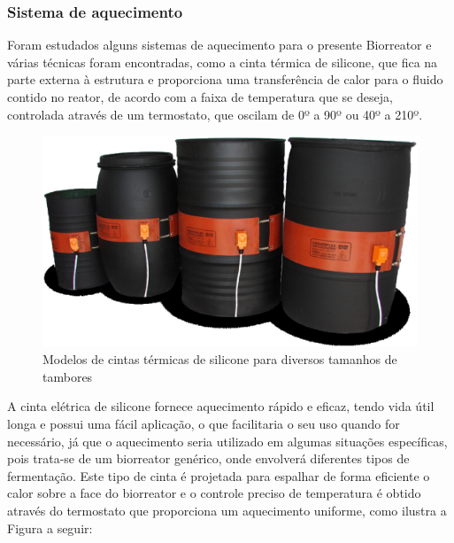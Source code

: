 \subsubsection{Sistema de aquecimento}

Foram estudados alguns sistemas de aquecimento para o presente Biorreator e várias técnicas foram encontradas, como a  cinta térmica de silicone, que fica na parte externa à estrutura e proporciona uma transferência de calor para o fluido contido no reator, de acordo com a faixa de temperatura que se deseja, controlada através de um termostato, que oscilam de 0º a 90º ou 40º a 210º.

\begin{figure}[h]
	\centering
	\includegraphics[keepaspectratio=true,scale=0.3]{figuras/cinta.eps}
	\caption{Modelos de cintas térmicas de silicone para diversos tamanhos de tambores}
	\label{cinta}
\end{figure}

A cinta elétrica de silicone fornece aquecimento rápido e eficaz, tendo vida útil longa e possui uma fácil aplicação, o que facilitaria o seu uso quando for necessário, já que o aquecimento seria utilizado em algumas situações específicas, pois trata-se de um biorreator genérico, onde envolverá diferentes tipos de fermentação. Este tipo de cinta é projetada para espalhar de forma eficiente o calor sobre a face do biorreator e o controle preciso de temperatura é obtido através do termostato que proporciona um aquecimento uniforme, como ilustra a Figura a seguir:


